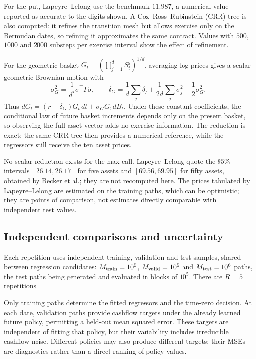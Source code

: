 \documentclass[11pt,a4paper]{article}
\begin{document}
For the put, Lapeyre--Lelong use the benchmark $11.987$, a numerical value reported
as accurate to the digits shown. A Cox--Ross--Rubinstein (CRR) tree is also computed:
it refines the transition mesh but allows exercise only on the Bermudan dates, so
refining it approximates the same contract. Values with $500$, $1000$ and $2000$
substeps per exercise interval show the effect of refinement.

For the geometric basket $G_t=(\prod_{j=1}^dS_t^j)^{1/d}$, averaging log-prices
gives a scalar geometric Brownian motion with
\[
 \sigma_G^2=\frac1{d^2}\sigma^\top\Gamma\sigma,\qquad
 \delta_G=\frac1d\sum_j\delta_j
 +\frac1{2d}\sum_j\sigma_j^2-\frac12\sigma_G^2.
\]
Thus $dG_t=(r-\delta_G)G_t\,dt+\sigma_GG_t\,dB_t$. Under these constant coefficients,
the conditional law of future basket increments depends only on the present basket,
so observing the full asset vector adds no exercise information. The reduction is
exact; the same CRR tree then provides a numerical reference, while the regressors
still receive the ten asset prices.

No scalar reduction exists for the max-call. Lapeyre--Lelong quote the $95\%$
intervals $[26.14,26.17]$ for five assets and $[69.56,69.95]$ for fifty assets,
obtained by Becker et al.; they are not recomputed here. The prices tabulated by
Lapeyre--Lelong are estimated on the training paths, which can be optimistic;
they are points of comparison, not estimates directly comparable with independent
test values.

\subsection{Independent comparisons and uncertainty}
Each repetition uses independent training, validation and test samples, shared
between regression candidates: $M_{\rm train}=10^5$, $M_{\rm valid}=10^5$ and
$M_{\rm test}=10^6$ paths, the test paths being generated and evaluated in blocks
of $10^5$. There are $R=5$ repetitions.

Only training paths determine the fitted regressors and the time-zero decision.
At each date, validation paths provide cashflow targets under the already learned
future policy, permitting a held-out mean squared error. These targets are
independent of fitting that policy, but their variability includes irreducible
cashflow noise. Different policies may also produce different targets; their
MSEs are diagnostics rather than a direct ranking of policy values.
\end{document}
